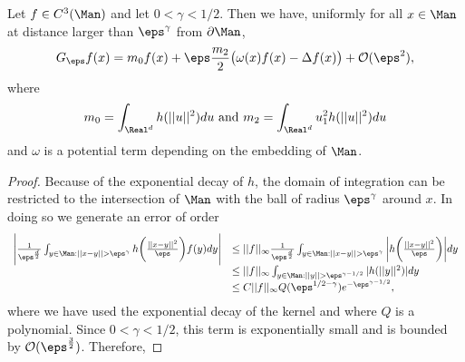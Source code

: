\begin{theorem}
Let $f\in C^3(\Man)$ and let $0 <\gamma<1/2$. Then we have, uniformly for all $x\in\Man$ at distance larger than $\eps^\gamma$ from $\partial\Man$,
\begin{equation*}
G_\eps f(x)=m_0 f(x)+\eps\frac{m_2}{2}\big(\omega(x)f(x)-\Delta f(x) \big)+\mathcal{O}(\eps^2),
\end{equation*}
where
\begin{equation*}
m_0=\int_{\Real^d} h(||u||^2)du \text{ and } m_2=\int_{\Real^d} u_1^2 h(||u||^2)du
\end{equation*}
and $\omega$ is a potential term depending on the embedding of $\Man$.
\end{theorem}
\begin{proof}
Because of the exponential decay of $h$, the domain of integration can be restricted to the intersection of $\Man$ with the ball of radius $\eps^\gamma$ around $x$. In doing so we generate an error of order
\begin{equation*}
\begin{array}{l l}
\Bigg|\frac{1}{\eps^\frac{d}{2}}\int_{y\in\Man:||x-y||>\eps^\gamma} h\bigg(\frac{||x-y||^2}{\eps} \bigg)f(y)dy \Bigg|&\leq
||f||_\infty \frac{1}{\eps^\frac{d}{2}}\int_{y\in\Man:||x-y||>\eps^\gamma} \bigg|h\bigg(\frac{||x-y||^2}{\eps} \bigg)\bigg|dy \\
&\leq ||f||_\infty \int_{y\in\Man:||y||>\eps^{\gamma-1/2}} |h(||y||^2)|dy \\
&\leq C||f||_\infty Q(\eps^{1/2-\gamma})e^{-\eps^{\gamma-1/2}},
\end{array}
\end{equation*}
where we have used the exponential decay of the kernel and where $Q$ is a polynomial. Since $0<\gamma<1/2$, this term is exponentially small and is bounded by $\mathcal{O}(\eps^{\frac{3}{2}})$. Therefore,
\end{proof}



























